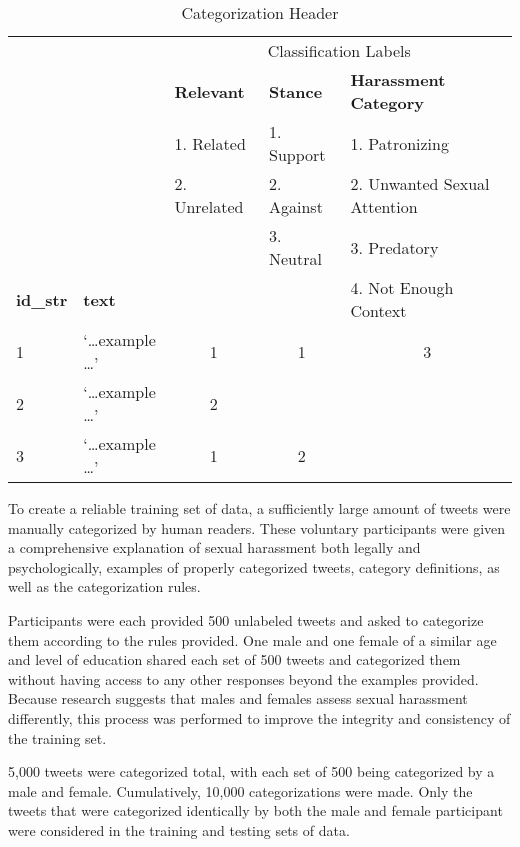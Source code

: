 \begin{table}[H]
    \centering
    \caption{Categorization Header}
    \begin{tabular}{b{1cm} b{2.5cm} b{2cm} b{2cm} b{4.7cm}}
        \toprule
        \multicolumn{2}{c}{} &
        \multicolumn{3}{c}{Classification Labels}\\
        \cmidrule(lr){3-5}
        \rowcolor{White}& {} & {\textbf{Relevant}} & {\textbf{Stance}} & {\textbf{Harassment Category}} \\
        & {} & {1. Related} & {1. Support} & {1. Patronizing} \\
        \rowcolor{White}& {} & {2. Unrelated} & {2. Against} & {2. Unwanted Sexual Attention} \\
        & {} & {} & {3. Neutral} & {3. Predatory} \\
        \rowcolor{White}\textbf{id\_str} & {\textbf{text}} & {} & {} & {4. Not Enough Context} \\

        \midrule
        1 & `\ldots example \ldots' & \multicolumn{1}{c}{1} & \multicolumn{1}{c}{1} & \multicolumn{1}{c}{3}\\
        2 & `\ldots example \ldots' & \multicolumn{1}{c}{2} & \multicolumn{1}{c}{ } & \multicolumn{1}{c}{ }\\
        3 & `\ldots example \ldots' & \multicolumn{1}{c}{1} & \multicolumn{1}{c}{2} & \multicolumn{1}{c}{ }\\
        \bottomrule
    \end{tabular}
\end{table}


To create a reliable training set of data, a sufficiently large amount of tweets were manually categorized by human readers. These voluntary participants were given a comprehensive explanation of sexual harassment both legally and psychologically, examples of properly categorized tweets, category definitions, as well as the categorization rules.

Participants were each provided 500 unlabeled tweets and asked to categorize them according to the rules provided. One male and one female of a similar age and level of education shared each set of 500 tweets and categorized them without having access to any other responses beyond the examples provided. Because research suggests that males and females assess sexual harassment differently, this process was performed to improve the integrity and consistency of the training set.

5,000 tweets were categorized total, with each set of 500 being categorized by a male and female. Cumulatively, 10,000 categorizations were made. Only the tweets that were categorized identically by both the male and female participant were considered in the training and testing sets of data. 
